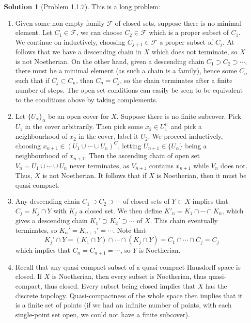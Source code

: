 \documentclass[aps,pra,showpacs,notitlepage,onecolumn,superscriptaddress,nofootinbib]{revtex4-1}
\theoremstyle{definition}
\newtheorem{solution}{Solution}[section]
\begin{document}
\begin{solution}[Problem 1.1.7]
  This is a long problem:
  \begin{enumerate}
    \item Given some non-empty family $\mathcal{F}$ of closed sets, suppose there is no minimal element. Let $C_1 \in \mathcal{F}$, we can choose
      $C_2 \in \mathcal{F}$ which is a proper subset of $C_1$. We continue on inductively, choosing $C_{j + 1} \in \mathcal{F}$ a proper subset of $C_j$. At follows that
      we have a descending chain in $X$ which does not terminate, so $X$ is not Noetherian. On the other hand, given a descending chain $C_1 \supset C_2 \supset \cdots$, there must
      be a minimal element (as such a chain is a family), hence some $C_n$ such that if $C_j \subset C_n$, then $C_n = C_j$, so the chain terminates after a finite number of steps. The open set conditions can easily
      be seen to be equivalent to the conditions above by taking complements.
      \item Let $\{U_{\alpha}\}_{\alpha}$ be an open cover for $X$. Suppose there is no finite subcover. Pick $U_1$ in the cover arbitrarily. Then pick some $x_2 \in U_1^{C}$ and pick a neighbourhood
        of $x_2$ in the cover, label it $U_2$. We proceed inductively, choosing $x_{n + 1} \in (U_1 \cup \cdots \cup U_n)^{C}$, letting $U_{n + 1} \in \{U_{\alpha}\}$ being a neighbourhood of $x_{n + 1}$. Then the ascending
        chain of open set $V_n = U_1 \cup \cdots \cup U_n$ never terminates, as $V_{n + 1}$ contains $x_{n + 1}$ while $V_n$ does not. Thus, $X$ is not Noetherian. It follows that if $X$ is Noetherian, then it must be
        quasi-compact.
        \item Any descending chain $C_1 \supset C_2 \supset \cdots$ of closed sets of $Y \subset X$ implies that $C_j = K_j \cap Y$ with $K_j$ a closed set. We then define
          $K'_n = K_1 \cap \cdots \cap K_n$, which gives a descending chain $K_1' \supset K_2' \supset \cdots$ of $X$. This chain eventually terminates, so $K_n' = K_{n + 1}' = \cdots$.
          Note that
          \begin{equation}
          K_j' \cap Y = (K_1 \cap Y) \cap \cdots \cap (K_j \cap Y) = C_1 \cap \cdots \cap C_j = C_j
          \end{equation}
          which implies that $C_n = C_{n + 1} = \cdots$, so $Y$ is Noetherian.
          \item Recall that any quasi-compact subset of a quasi-compact Hausdorff space is closed. If $X$ is Noetherian, then every subset is Noetherian, thus quasi-compact, thus closed.
           Every subset being closed implies that $X$ has the discrete topology. Quasi-compactness of the whole space then implies that it is a finite set of points (if we had an infinite number of points,
           with each single-point set open, we could not have a finite subcover).
    \end{enumerate}
  \end{solution}
\end{document}
